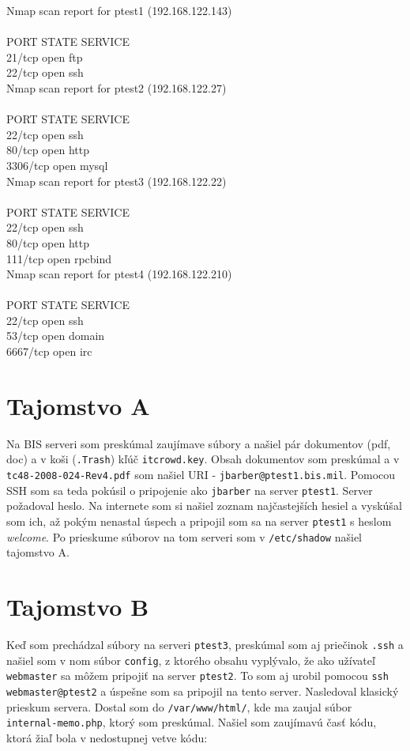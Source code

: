 \documentclass[]{article}
\begin{document}
\begin{framed}
\noindent Nmap scan report for ptest1 (192.168.122.143)\\\\
PORT   STATE SERVICE\\
21/tcp open  ftp\\
22/tcp open  ssh\\

\noindent Nmap scan report for ptest2 (192.168.122.27)\\\\
PORT     STATE SERVICE\\
22/tcp   open  ssh\\
80/tcp   open  http\\
3306/tcp open  mysql\\

\noindent Nmap scan report for ptest3 (192.168.122.22)\\\\
PORT    STATE SERVICE\\
22/tcp  open  ssh\\
80/tcp  open  http\\
111/tcp open  rpcbind\\

\noindent Nmap scan report for ptest4 (192.168.122.210)\\\\
PORT     STATE SERVICE\\
22/tcp   open  ssh\\
53/tcp   open  domain\\
6667/tcp open  irc
\end{framed}

\section*{Tajomstvo A}
Na BIS serveri som preskúmal zaujímave súbory a našiel pár dokumentov (pdf, doc) a v koši (\texttt{.Trash}) kľúč \texttt{itcrowd.key}. Obsah dokumentov som preskúmal a v \texttt{tc48-2008-024-Rev4.pdf} som našiel URI \-- \texttt{jbarber@ptest1.bis.mil}. Pomocou SSH som sa teda pokúsil o pripojenie ako \texttt{jbarber} na server \texttt{ptest1}. Server požadoval heslo. Na internete som si našiel zoznam najčastejších hesiel a vyskúšal som ich, až pokým nenastal úspech a pripojil som sa na server \texttt{ptest1} s heslom \textit{welcome}. Po prieskume súborov na tom serveri som v \texttt{/etc/shadow} našiel tajomstvo A.

\section*{Tajomstvo B}
Keď som prechádzal súbory na serveri \texttt{ptest3}, preskúmal som aj priečinok \texttt{.ssh} a našiel som v nom súbor \texttt{config}, z ktorého obsahu vyplývalo, že ako užívateľ \texttt{webmaster} sa môžem pripojiť na server \texttt{ptest2}. To som aj urobil pomocou \texttt{ssh webmaster@ptest2} a úspešne som sa pripojil na tento server. Nasledoval klasický prieskum servera. Dostal som do \texttt{/var/www/html/}, kde ma zaujal súbor \texttt{internal-memo.php}, ktorý som preskúmal. Našiel som zaujímavú časť kódu, ktorá žiaľ bola v nedostupnej vetve kódu:
\end{document}
